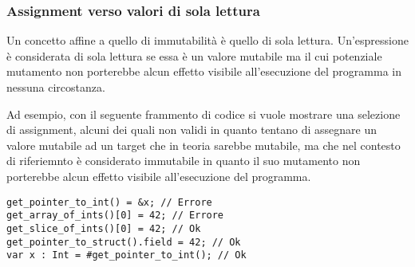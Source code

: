 \subsubsection{Assignment verso valori di sola lettura}
Un concetto affine a quello di immutabilità è quello di sola lettura. Un'espressione è 
considerata di sola lettura se essa è un valore mutabile ma il cui potenziale mutamento 
non porterebbe alcun effetto visibile all'esecuzione del programma in nessuna circostanza.

Ad esempio, con il seguente frammento di codice si vuole mostrare una selezione di assignment, 
alcuni dei quali non validi in quanto tentano di assegnare un valore mutabile ad un target che 
in teoria sarebbe mutabile, ma che nel contesto di riferiemnto è considerato immutabile in quanto 
il suo mutamento non porterebbe alcun effetto visibile all'esecuzione del programma. \\

\begin{lstlisting}[frame=single]
get_pointer_to_int() = &x; // Errore
get_array_of_ints()[0] = 42; // Errore
get_slice_of_ints()[0] = 42; // Ok
get_pointer_to_struct().field = 42; // Ok
var x : Int = #get_pointer_to_int(); // Ok
\end{lstlisting}
\vspace{0.5cm}